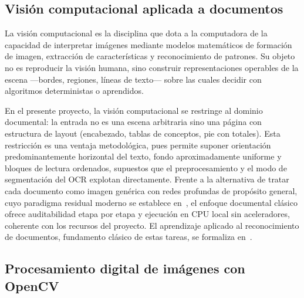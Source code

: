 \subsection{Visión computacional aplicada a documentos} \label{sec:mt_vision}

La visión computacional es la disciplina que dota a la computadora de la capacidad de interpretar imágenes mediante modelos matemáticos de formación de imagen, extracción de características y reconocimiento de patrones\cite{bradski_opencv_2008}. Su objeto no es reproducir la visión humana, sino construir representaciones operables de la escena —bordes, regiones, líneas de texto— sobre las cuales decidir con algoritmos deterministas o aprendidos\cite{bradski_opencv_2008, opencv_docs}.

En el presente proyecto, la visión computacional se restringe al dominio documental: la entrada no es una escena arbitraria sino una página con estructura de layout (encabezado, tablas de conceptos, pie con totales). Esta restricción es una ventaja metodológica, pues permite suponer orientación predominantemente horizontal del texto, fondo aproximadamente uniforme y bloques de lectura ordenados, supuestos que el preprocesamiento y el modo de segmentación del OCR explotan directamente\cite{smith_tesseract_2007, opencv_docs}. Frente a la alternativa de tratar cada documento como imagen gen\'erica con redes profundas de prop\'osito general, cuyo paradigma residual moderno se establece en~\cite{he_resnet_2016}, el enfoque documental cl\'asico ofrece auditabilidad etapa por etapa y ejecuci\'on en CPU local sin aceleradores, coherente con los recursos del proyecto\cite{bradski_opencv_2008, tesseract_ocr}. El aprendizaje aplicado al reconocimiento de documentos, fundamento cl\'asico de estas tareas, se formaliza en~\cite{lecun_gradient_1998}.

\subsection{Procesamiento digital de imágenes con OpenCV} \label{sec:mt_pdi}

